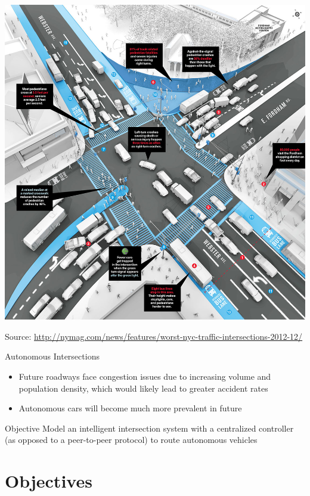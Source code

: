 
\begin{frame}[plain]
\centering
\includegraphics[width=0.75\linewidth]{diagram/nymag_intersection.jpg}

\tiny Source: \url{http://nymag.com/news/features/worst-nyc-traffic-intersections-2012-12/}
\end{frame}

\begin{frame}{Autonomous Intersections}
\begin{itemize}
\item Future roadways face congestion issues due to increasing volume
	and population density, which would likely lead to greater accident rates
\item Autonomous cars will become much more prevalent in future
\end{itemize}
\begin{block}{Objective}
Model an intelligent intersection system with a centralized controller
(as opposed to a peer-to-peer protocol) to route autonomous vehicles
\end{block}
\end{frame}


\section{Objectives}

